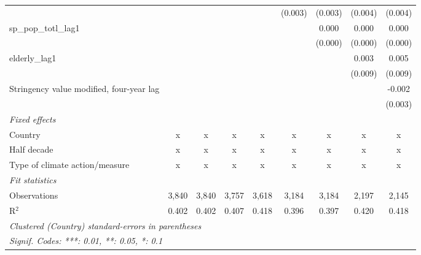 \begin{tabular}{lcccccccc}
                                                    &               &               &                &                & (0.003)       & (0.003)       & (0.004)        & (0.004)\\   
   sp\_pop\_totl\_lag1                              &               &               &                &                &               & 0.000         & 0.000          & 0.000\\   
                                                    &               &               &                &                &               & (0.000)       & (0.000)        & (0.000)\\   
   elderly\_lag1                                    &               &               &                &                &               &               & 0.003          & 0.005\\   
                                                    &               &               &                &                &               &               & (0.009)        & (0.009)\\   
   Stringency value modified, four-year lag         &               &               &                &                &               &               &                & -0.002\\   
                                                    &               &               &                &                &               &               &                & (0.003)\\   
   \emph{Fixed effects}\\
   Country                                          & x             & x             & x              & x              & x             & x             & x              & x\\  
   Half decade                                      & x             & x             & x              & x              & x             & x             & x              & x\\  
   Type of climate action/measure                   & x             & x             & x              & x              & x             & x             & x              & x\\  
   \midrule \emph{Fit statistics}\\
   Observations                                     & 3,840         & 3,840         & 3,757          & 3,618          & 3,184         & 3,184         & 2,197          & 2,145\\  
   R$^2$                                            & 0.402         & 0.402         & 0.407          & 0.418          & 0.396         & 0.397         & 0.420          & 0.418\\  
   \midrule
   \multicolumn{9}{l}{\emph{Clustered (Country) standard-errors in parentheses}}\\
   \multicolumn{9}{l}{\emph{Signif. Codes: ***: 0.01, **: 0.05, *: 0.1}}\\
\end{tabular}
\par\endgroup


